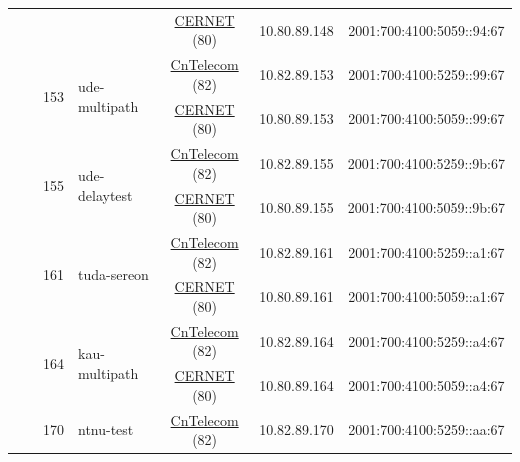 \begin{small}
\begin{center}
\begin{longtable}{|c|c|c|c|c|c|c|c|}
  &  &  &  & \multicolumn{2}{|c|}{\tiny{\href{http://www.cernet.edu.cn}{CERNET} (80)}} & \tiny{10.80.89.148} & \tiny{2001:700:4100:5059::94:67} \\* \cline{3-3}\cline{4-4}\cline{5-5}\cline{6-6}\cline{7-7}\cline{8-8}
  &  & \multirow{2}{*}{\tiny{153}} & \multicolumn{1}{|l|}{\multirow{2}{*}{\tiny{ude-multipath}}} & \multicolumn{2}{|c|}{\tiny{\href{http://www.chinatelecom.com.cn}{CnTelecom} (82)}} & \tiny{10.82.89.153} & \tiny{2001:700:4100:5259::99:67} \\* \cline{5-5}\cline{6-6}\cline{7-7}\cline{8-8}
  &  &  &  & \multicolumn{2}{|c|}{\tiny{\href{http://www.cernet.edu.cn}{CERNET} (80)}} & \tiny{10.80.89.153} & \tiny{2001:700:4100:5059::99:67} \\* \cline{3-3}\cline{4-4}\cline{5-5}\cline{6-6}\cline{7-7}\cline{8-8}
  &  & \multirow{2}{*}{\tiny{155}} & \multicolumn{1}{|l|}{\multirow{2}{*}{\tiny{ude-delaytest}}} & \multicolumn{2}{|c|}{\tiny{\href{http://www.chinatelecom.com.cn}{CnTelecom} (82)}} & \tiny{10.82.89.155} & \tiny{2001:700:4100:5259::9b:67} \\* \cline{5-5}\cline{6-6}\cline{7-7}\cline{8-8}
  &  &  &  & \multicolumn{2}{|c|}{\tiny{\href{http://www.cernet.edu.cn}{CERNET} (80)}} & \tiny{10.80.89.155} & \tiny{2001:700:4100:5059::9b:67} \\* \cline{3-3}\cline{4-4}\cline{5-5}\cline{6-6}\cline{7-7}\cline{8-8}
  &  & \multirow{2}{*}{\tiny{161}} & \multicolumn{1}{|l|}{\multirow{2}{*}{\tiny{tuda-sereon}}} & \multicolumn{2}{|c|}{\tiny{\href{http://www.chinatelecom.com.cn}{CnTelecom} (82)}} & \tiny{10.82.89.161} & \tiny{2001:700:4100:5259::a1:67} \\* \cline{5-5}\cline{6-6}\cline{7-7}\cline{8-8}
  &  &  &  & \multicolumn{2}{|c|}{\tiny{\href{http://www.cernet.edu.cn}{CERNET} (80)}} & \tiny{10.80.89.161} & \tiny{2001:700:4100:5059::a1:67} \\* \cline{3-3}\cline{4-4}\cline{5-5}\cline{6-6}\cline{7-7}\cline{8-8}
  &  & \multirow{2}{*}{\tiny{164}} & \multicolumn{1}{|l|}{\multirow{2}{*}{\tiny{kau-multipath}}} & \multicolumn{2}{|c|}{\tiny{\href{http://www.chinatelecom.com.cn}{CnTelecom} (82)}} & \tiny{10.82.89.164} & \tiny{2001:700:4100:5259::a4:67} \\* \cline{5-5}\cline{6-6}\cline{7-7}\cline{8-8}
  &  &  &  & \multicolumn{2}{|c|}{\tiny{\href{http://www.cernet.edu.cn}{CERNET} (80)}} & \tiny{10.80.89.164} & \tiny{2001:700:4100:5059::a4:67} \\* \cline{3-3}\cline{4-4}\cline{5-5}\cline{6-6}\cline{7-7}\cline{8-8}
  &  & \multirow{2}{*}{\tiny{170}} & \multicolumn{1}{|l|}{\multirow{2}{*}{\tiny{ntnu-test}}} & \multicolumn{2}{|c|}{\tiny{\href{http://www.chinatelecom.com.cn}{CnTelecom} (82)}} & \tiny{10.82.89.170} & \tiny{2001:700:4100:5259::aa:67} \\* \cline{5-5}\cline{6-6}\cline{7-7}\cline{8-8}

\end{longtable}
\end{center}
\end{small}
